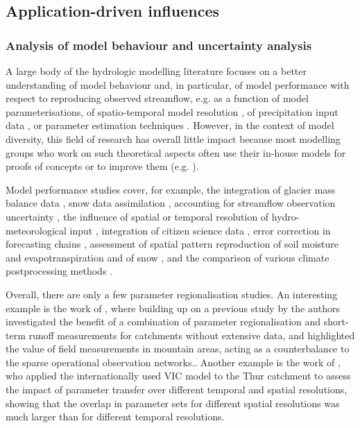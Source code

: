 \documentclass[10pt,a4paper]{article}
\begin{document}
\subsection{Application-driven influences}
\label{sec:context:application}


\subsubsection{Analysis of model behaviour and uncertainty analysis}
\label{sec:context:uncertainty}

A large body of the hydrologic modelling literature focuses on a better understanding of model behaviour and, in particular, of model performance with respect to reproducing observed streamflow, e.g. as a function of model parameterisations, of spatio-temporal model resolution \citep{Brunner2019}, of precipitation input data \citep{Sikorska2016, Sikorska2017, MullerThomy2019}, or parameter estimation techniques \citep{Foglia2009, Cullmann2011}. However, in the context of model diversity, this field of research has overall little impact because most modelling groups who work on such theoretical aspects often use their in-house models for proofs of concepts or to improve them (e.g. \citealt{Schaefli2007, Hingray2010}).

Model performance studies cover, for example, the integration of glacier mass balance data \citep{Finger2015, Schaefli2011}, snow data assimilation \citep{Griessinger2016}, accounting for streamflow observation uncertainty \citep{Westerberg2020}, the influence of spatial or temporal resolution of hydro-meteorological input \citep{GironsLopez2016, Felder2017, Sikorska2018}, integration of citizen science data \citep{Etter2020}, error correction in forecasting chains \citep{Bogner2018}, assessment of spatial pattern reproduction of soil moisture and evapotranspiration \citep{Rossler2010, Zappa2003} and of snow \citep{Zappa2008a}, and the comparison of various climate postprocessing methods \citep{Rossler2019}.

Overall, there are only a few parameter regionalisation studies. An interesting example is the work of \citet{Viviroli2015}, where building up on a previous study by \citet{Viviroli2009c} the authors investigated the benefit of a combination of parameter regionalisation and short-term runoff measurements for catchments without extensive data, and highlighted the value of field measurements in mountain areas, acting as a counterbalance to the sparse operational observation networks.. Another example is the work of \citet{Melsen2016}, who applied the internationally used VIC model to the Thur catchment to assess the impact of parameter transfer over different temporal and spatial resolutions, showing that the overlap
in parameter sets for different spatial resolutions was much
larger than for different temporal resolutions.
\end{document}
